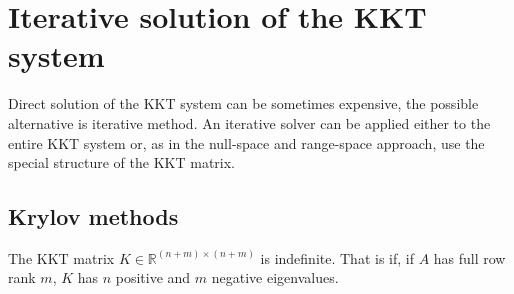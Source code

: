 \section{Iterative solution of the KKT system}
Direct solution of the KKT system can be sometimes expensive, the possible alternative is iterative method. An iterative solver can be applied either to the entire KKT system or, as in the null-space and range-space approach, use the special structure of the KKT matrix.
\subsection*{Krylov methods}
The KKT matrix $K\in \mathbb{R}^{(n+m)\times (n+m)}$ is indefinite. That is if, if $A$ has full row rank $m$, $K$ has $n$ positive and $m$ negative eigenvalues.






























